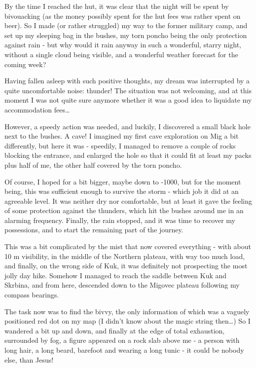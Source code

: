 By the time I reached the hut, it was clear that the night will be spent
by bivouacking (as the money possibly spent for the hut fees was rather
spent on beer). So I made (or rather struggled) my way to the former
military camp, and set up my sleeping bag in the bushes, my torn poncho
being the only protection against rain - but why would it rain anyway in
such a wonderful, starry night, without a single cloud being visible,
and a wonderful weather forecast for the coming week?

Having fallen asleep with such positive thoughts, my dream was
interrupted by a quite uncomfortable noise: thunder! The situation was
not welcoming, and at this moment I was not quite sure anymore whether
it was a good idea to liquidate my accommodation fees\ldots{}

However, a speedy action was needed, and luckily, I discovered a small
black hole next to the bushes. A cave! I imagined my first cave
exploration on Mig a bit differently, but here it was - speedily, I
managed to remove a couple of rocks blocking the entrance, and enlarged
the hole so that it could fit at least my packs plus half of me, the
other half covered by the torn poncho.

Of course, I hoped for a bit bigger, maybe down to -1000, but for the
moment being, this was sufficient enough to survive the storm - which
job it did at an agreeable level. It was neither dry nor comfortable,
but at least it gave the feeling of some protection against the
thunders, which hit the bushes around me in an alarming frequency.
Finally, the rain stopped, and it was time to recover my possessions,
and to start the remaining part of the journey.

This was a bit complicated by the mist that now covered everything -
with about 10 m visibility, in the middle of the Northern plateau, with
way too much load, and finally, on the wrong side of Kuk, it was
definitely not prospecting the most jolly day hike. Somehow I managed to
reach the saddle between Kuk and Skrbina, and from here, descended down
to the Migovec plateau following my compass bearings.

The task now was to find the bivvy, the only information of which was a
vaguely positioned red dot on my map (I didn't know about the magic
string then\ldots{}) So I wandered a bit up and down, and finally at the
edge of total exhaustion, surrounded by fog, a figure appeared on a rock
slab above me - a person with long hair, a long beard, barefoot and
wearing a long tunic - it could be nobody else, than Jesus!

